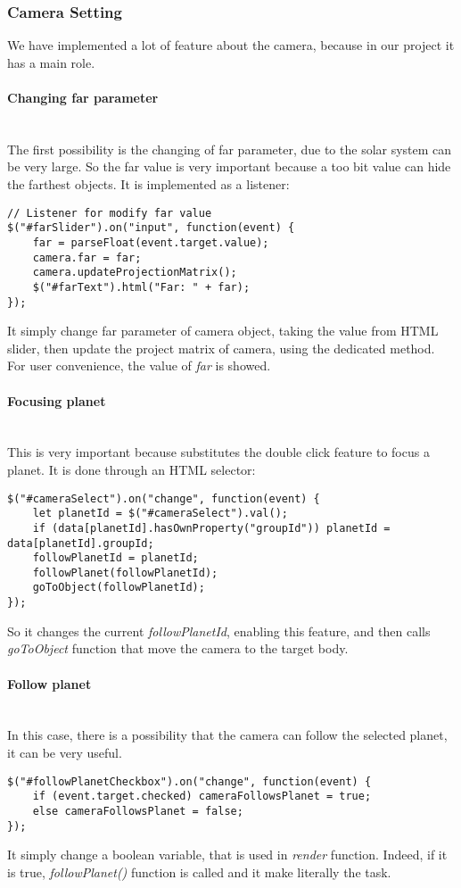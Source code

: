\documentclass{article}
\begin{document}
\subsubsection{Camera Setting}
We have implemented a lot of feature about the camera, because in our project it has a main role.
\paragraph{Changing far parameter}\mbox{}\\
The first possibility is the changing of far parameter, due to the solar system can be very large. So the far value is very important because a too bit value can hide the farthest objects. It is implemented as a listener:
\begin{lstlisting}
// Listener for modify far value
$("#farSlider").on("input", function(event) {
	far = parseFloat(event.target.value);
	camera.far = far;
	camera.updateProjectionMatrix();
	$("#farText").html("Far: " + far);
});
\end{lstlisting}
It simply change far parameter of camera object, taking the value from HTML slider, then update the project matrix of camera, using the dedicated method. For user convenience, the value of \textit{far} is showed.
\paragraph{Focusing planet}\mbox{}\\
This is very important because substitutes the double click feature to focus a planet. It is done through an HTML selector:
\begin{lstlisting}
$("#cameraSelect").on("change", function(event) {
	let planetId = $("#cameraSelect").val();
	if (data[planetId].hasOwnProperty("groupId")) planetId = data[planetId].groupId;
	followPlanetId = planetId;
	followPlanet(followPlanetId);
	goToObject(followPlanetId);
});
\end{lstlisting}
So it changes the current \textit{followPlanetId}, enabling this feature, and then calls \textit{goToObject} function that move the camera to the target body.

\paragraph{Follow planet}\mbox{}\\
In this case, there is a possibility that the camera can follow the selected planet, it can be very useful.
\begin{lstlisting}
$("#followPlanetCheckbox").on("change", function(event) {
	if (event.target.checked) cameraFollowsPlanet = true;
	else cameraFollowsPlanet = false;
});
\end{lstlisting}
It simply change a boolean variable, that is used in \textit{render} function. Indeed, if it is true, \textit{followPlanet()} function is called and it make literally the task.
\end{document}
